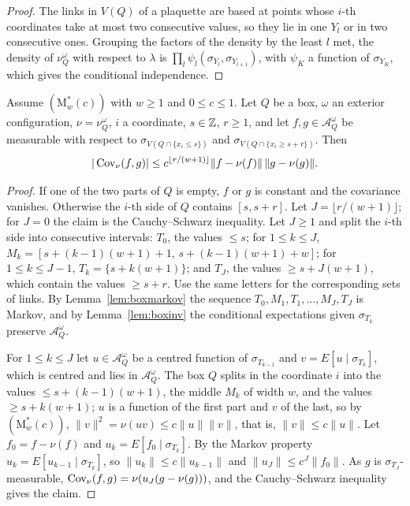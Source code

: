 \begin{proof}
The links in $V(Q)$ of a plaquette are based at points whose $i$-th
coordinates take at most two consecutive values, so they lie in one $Y_l$ or
in two consecutive ones. Grouping the factors of the density by the least
$l$ met, the density of $\nu^\omega_Q$ with respect to $\lambda$ is
$\prod_l\psi_l(\sigma_{Y_l},\sigma_{Y_{l+1}})$, with $\psi_K$ a function of
$\sigma_{Y_K}$, which gives the conditional independence.
\end{proof}

\begin{proposition}\label{prop:alldecay}
Assume $(\mathrm M^*_w(c))$ with $w\ge1$ and $0\le c\le1$. Let $Q$ be a box,
$\omega$ an exterior configuration, $\nu=\nu^\omega_Q$, $i$ a coordinate,
$s\in\mathbb{Z}$, $r\ge1$, and let $f,g\in\mathcal A^\omega_Q$ be measurable with
respect to $\sigma_{V(Q\cap\{x_i\le s\})}$ and $\sigma_{V(Q\cap\{x_i\ge
s+r\})}$. Then
\[
|\operatorname{Cov}_\nu(f,g)|\le c^{\lfloor r/(w+1)\rfloor}\|f-\nu(f)\|\,\|g-\nu(g)\|.
\]
\end{proposition}

\begin{proof}
If one of the two parts of $Q$ is empty, $f$ or $g$ is constant and the
covariance vanishes. Otherwise the $i$-th side of $Q$ contains $[s,s+r]$.
Let $J=\lfloor r/(w+1)\rfloor$; for $J=0$ the claim is the Cauchy--Schwarz
inequality. Let $J\ge1$ and split the $i$-th side into consecutive
intervals: $T_0$, the values $\le s$; for $1\le k\le J$, $M_k=[s+(k-1)(w+1)+
1,\,s+(k-1)(w+1)+w]$; for $1\le k\le J-1$, $T_k=\{s+k(w+1)\}$; and $T_J$, the
values $\ge s+J(w+1)$, which contain the values $\ge s+r$. Use the same
letters for the corresponding sets of links. By Lemma~\ref{lem:boxmarkov}
the sequence $T_0,M_1,T_1,\dots,M_J,T_J$ is Markov, and by
Lemma~\ref{lem:boxinv} the conditional expectations given $\sigma_{T_k}$
preserve $\mathcal A^\omega_Q$.

For $1\le k\le J$ let $u\in\mathcal A^\omega_Q$ be a centred function of
$\sigma_{T_{k-1}}$ and $v=E[u\mid\sigma_{T_k}]$, which is centred and lies
in $\mathcal A^\omega_Q$. The box $Q$ splits in the coordinate $i$ into the
values $\le s+(k-1)(w+1)$, the middle $M_k$ of width $w$, and the values
$\ge s+k(w+1)$; $u$ is a function of the first part and $v$ of the last, so
by $(\mathrm M^*_w(c))$, $\|v\|^2=\nu(uv)\le c\|u\|\|v\|$, that is,
$\|v\|\le c\|u\|$. Let $f_0=f-\nu(f)$ and $u_k=E[f_0\mid\sigma_{T_k}]$. By
the Markov property $u_k=E[u_{k-1}\mid\sigma_{T_k}]$, so $\|u_k\|\le
c\|u_{k-1}\|$ and $\|u_J\|\le c^J\|f_0\|$. As $g$ is
$\sigma_{T_J}$-measurable, $\operatorname{Cov}_\nu(f,g)=\nu(u_J(g-\nu(g)))$, and the
Cauchy--Schwarz inequality gives the claim.
\end{proof}

